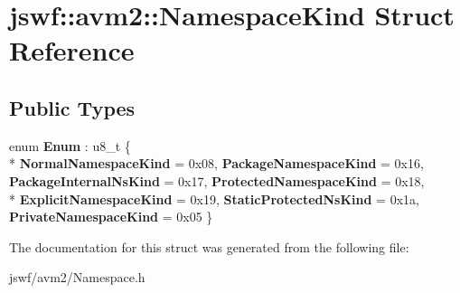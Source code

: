 \hypertarget{structjswf_1_1avm2_1_1_namespace_kind}{\section{jswf\+:\+:avm2\+:\+:Namespace\+Kind Struct Reference}
\label{structjswf_1_1avm2_1_1_namespace_kind}
}
\subsection*{Public Types}
\begin{DoxyCompactItemize}
\item 
\hypertarget{structjswf_1_1avm2_1_1_namespace_kind_a2a42f0e85fcb72dc05223c0720791aa8}{enum {\bfseries Enum} \+: u8\+\_\+t \{ \\*
{\bfseries Normal\+Namespace\+Kind} = 0x08, 
{\bfseries Package\+Namespace\+Kind} = 0x16, 
{\bfseries Package\+Internal\+Ns\+Kind} = 0x17, 
{\bfseries Protected\+Namespace\+Kind} = 0x18, 
\\*
{\bfseries Explicit\+Namespace\+Kind} = 0x19, 
{\bfseries Static\+Protected\+Ns\+Kind} = 0x1a, 
{\bfseries Private\+Namespace\+Kind} = 0x05
 \}}\label{structjswf_1_1avm2_1_1_namespace_kind_a2a42f0e85fcb72dc05223c0720791aa8}

\end{DoxyCompactItemize}


The documentation for this struct was generated from the following file\+:\begin{DoxyCompactItemize}
\item 
jswf/avm2/Namespace.\+h\end{DoxyCompactItemize}
